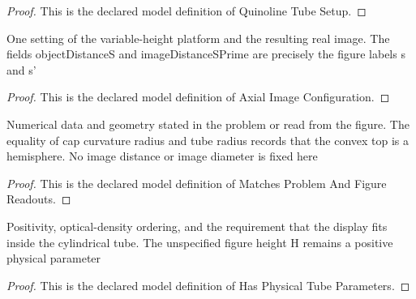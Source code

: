 \begin{proof}
  This is the declared model definition of Quinoline Tube Setup.
\end{proof}
\begin{definition}
  \label{def:physics:phyx-mini-0110:phyxminiproblems-problemphyxmini0110-axialimageconfiguration}
  One setting of the variable-height platform and the resulting real image. The fields objectDistanceS and imageDistanceSPrime are precisely the figure labels s and s'
\end{definition}
\begin{proof}
  This is the declared model definition of Axial Image Configuration.
\end{proof}
\begin{definition}
  \label{def:physics:phyx-mini-0110:phyxminiproblems-problemphyxmini0110-matchesproblemandfigurereadouts}
  Numerical data and geometry stated in the problem or read from the figure. The equality of cap curvature radius and tube radius records that the convex top is a hemisphere. No image distance or image diameter is fixed here
\end{definition}
\begin{proof}
  This is the declared model definition of Matches Problem And Figure Readouts.
\end{proof}
\begin{definition}
  \label{def:physics:phyx-mini-0110:phyxminiproblems-problemphyxmini0110-hasphysicaltubeparameters}
  Positivity, optical-density ordering, and the requirement that the display fits inside the cylindrical tube. The unspecified figure height H remains a positive physical parameter
\end{definition}
\begin{proof}
  This is the declared model definition of Has Physical Tube Parameters.
\end{proof}
